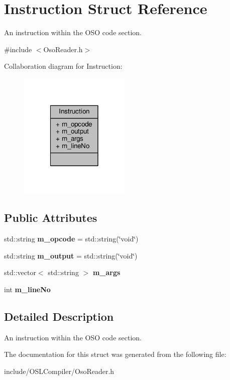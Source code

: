 \hypertarget{struct_instruction}{\section{Instruction Struct Reference}
\label{struct_instruction}
}


An instruction within the O\-S\-O code section.  




{\ttfamily \#include $<$Oso\-Reader.\-h$>$}



Collaboration diagram for Instruction\-:
\nopagebreak
\begin{figure}[H]
\begin{center}
\leavevmode
\includegraphics[width=150pt]{struct_instruction__coll__graph}
\end{center}
\end{figure}
\subsection*{Public Attributes}
\begin{DoxyCompactItemize}
\item 
\hypertarget{struct_instruction_aee4a8374afe12c8a7edbebd5b59adec1}{std\-::string {\bfseries m\-\_\-opcode} = std\-::string(\char`\"{}void\char`\"{})}\label{struct_instruction_aee4a8374afe12c8a7edbebd5b59adec1}

\item 
\hypertarget{struct_instruction_a02ef9c6ba83385398b4d303ba8ff72af}{std\-::string {\bfseries m\-\_\-output} = std\-::string(\char`\"{}void\char`\"{})}\label{struct_instruction_a02ef9c6ba83385398b4d303ba8ff72af}

\item 
\hypertarget{struct_instruction_afe73084538ea1cbbd9df65ab431e879d}{std\-::vector$<$ std\-::string $>$ {\bfseries m\-\_\-args}}\label{struct_instruction_afe73084538ea1cbbd9df65ab431e879d}

\item 
\hypertarget{struct_instruction_af01a80e058a81bf60a863de8d7684aec}{int {\bfseries m\-\_\-line\-No}}\label{struct_instruction_af01a80e058a81bf60a863de8d7684aec}

\end{DoxyCompactItemize}


\subsection{Detailed Description}
An instruction within the O\-S\-O code section. 

The documentation for this struct was generated from the following file\-:\begin{DoxyCompactItemize}
\item 
include/\-O\-S\-L\-Compiler/Oso\-Reader.\-h\end{DoxyCompactItemize}
